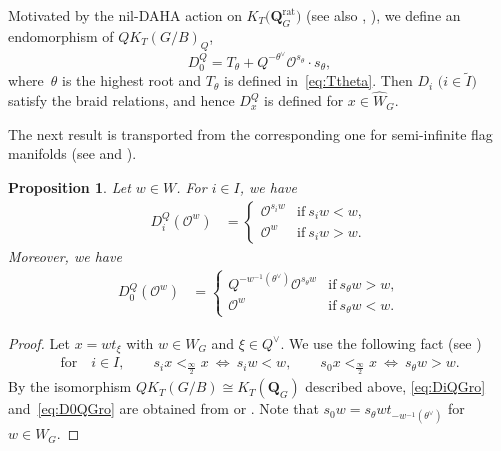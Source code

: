 \documentclass[10pt,a4paper]{amsart}
\numberwithin{equation}{section}
\newcommand{\sinf}{\frac{\infty}{2}}
\newtheorem{Proposition}[Theorem]{Proposition}
\theoremstyle{definition}
\begin{document}
Motivated by the nil-DAHA action on $K_T\bigl(\mathbf{Q}_G^{\mathrm{rat}}\bigr)$
\cite[Theorem 6.5]{KNS} (see also \cite[Section~3.1]{KoNOS}, \cite[Section~2.6]{Orr}),
we define
an endomorphism of
$QK_T(G/B)_Q$,
\[
D_0^Q=T_\theta+
Q^{-\theta^\vee}
\mathscr{O}^{s_\theta}\cdot
s_\theta,
\]
where~$\theta$ is the highest root and $T_\theta$ is defined in~\eqref{eq:Ttheta}.
Then $D_i$ $ \big(i\in \tilde{I}\big)$ satisfy the braid relations, and hence $D_x^Q$ is defined for $x\in \hat{W}_G$.

The next result is transported from
the corresponding one for semi-infinite flag manifolds
(see \cite[Section~2.6]{Orr} and \cite[Section~3.1]{KoNOS}).
\begin{Proposition}\label{prop:left_Dem}
Let $w\in W$. For $i\in I$, we have
\begin{align}
\label{eq:DiQGro}
D_i^Q(\mathscr{O}^w)
&=\begin{cases}
\mathscr{O}^{s_iw} & \text{if}\ s_iw<w,\\
 \mathscr{O}^{w} & \text{if}\ s_iw>w.
\end{cases} \end{align}
Moreover, we have
\begin{align}
\label{eq:D0QGro}
D_0^Q(\mathscr{O}^w)
&=\begin{cases}
 Q^{-w^{-1}(\theta^\vee)}\mathscr{O}^{s_\theta w} & \text{if}\ s_\theta w>w,\\
 \mathscr{O}^{w} & \text{if}\ s_\theta w<w.
\end{cases}
\end{align}
\end{Proposition}
\begin{proof}
Let $x=wt_\xi$
with $w\in W_G$
and $\xi\in Q^{\lor}$.
We use the following fact (see \cite[Appendix~A]{INS})
\begin{align*}
\text{for}\quad i\in I,\qquad s_i x<_\sinf x   \ \Longleftrightarrow \ s_i w< w,\qquad
 s_0 x<_\sinf x \ \Longleftrightarrow \ s_\theta w>w.
\end{align*}
By the isomorphism
$QK_T(G/B)\cong K_T(\mathbf{Q}_G)$ described above,
\eqref{eq:DiQGro} and~\eqref{eq:D0QGro} are obtained from
\cite[equation~(2.28)]{Orr} or \cite[equation~(3.19)]{KoNOS}.
Note that $s_0w=s_\theta w t_{-w^{-1}(\theta^\lor)}$
for $w\in W_G$.
\end{proof}
\end{document}
